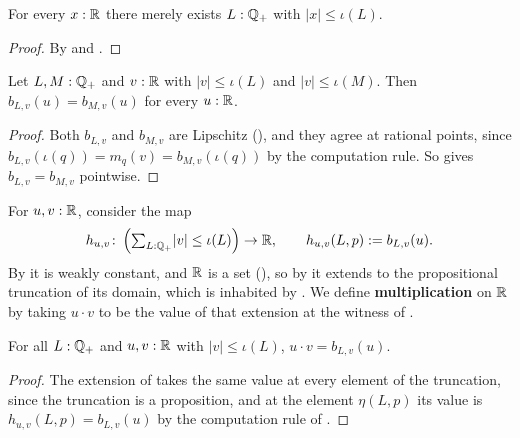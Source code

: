 \begin{corollary}
  \label{existsAbsLeRatReal}
  For every $x : \mathbb{R}$ there merely exists $L : \mathbb{Q}_{+}$ with $\lvert x \rvert \le \iota(L)$.
\end{corollary}
\begin{proof}
  By  and .
\end{proof}

\begin{lemma}
  \label{boundedMulEq}
  Let $L, M : \mathbb{Q}_{+}$ and $v : \mathbb{R}$ with $\lvert v \rvert \le \iota(L)$ and $\lvert v \rvert \le \iota(M)$. Then $b_{L,v}(u) = b_{M,v}(u)$ for every $u : \mathbb{R}$.
\end{lemma}
\begin{proof}
  Both $b_{L,v}$ and $b_{M,v}$ are Lipschitz (), and they agree at rational points, since $b_{L,v}(\iota(q)) = m_q(v) = b_{M,v}(\iota(q))$ by the computation rule. So  gives $b_{L,v} = b_{M,v}$ pointwise.
\end{proof}

\begin{definition}
  \label{mulReal}
  For $u, v : \mathbb{R}$, consider the map
  \[
    h_{u,v} \colon \left(\textstyle\sum_{L : \mathbb{Q}_{+}} \lvert v \rvert \le \iota(L)\right) \to \mathbb{R}, \qquad h_{u,v}(L, p) := b_{L,v}(u).
  \]
  By  it is weakly constant, and $\mathbb{R}$ is a set (), so by  it extends to the propositional truncation of its domain, which is inhabited by . We define \textbf{multiplication} on $\mathbb{R}$ by taking $u \cdot v$ to be the value of that extension at the witness of .
\end{definition}

\begin{lemma}
  \label{mulEqBoundedMul}
  For all $L : \mathbb{Q}_{+}$ and $u, v : \mathbb{R}$ with $\lvert v \rvert \le \iota(L)$, $u \cdot v = b_{L,v}(u)$.
\end{lemma}
\begin{proof}
  The extension of  takes the same value at every element of the truncation, since the truncation is a proposition, and at the element $\eta(L, p)$ its value is $h_{u,v}(L, p) = b_{L,v}(u)$ by the computation rule of .
\end{proof}

